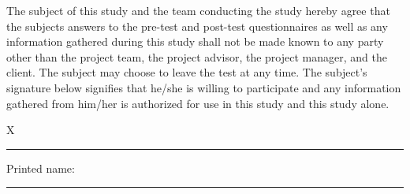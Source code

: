 \documentclass{article}
\begin{document}
\rhead{}

The subject of this study and the team conducting the study hereby agree that the subjects answers to the pre-test and post-test questionnaires as well as any information gathered during this study shall not be made known to any party other than the project team, the project advisor, the project manager, and the client.  The subject may choose to leave the test at any time.  The subject's signature below signifies that he/she is willing to participate and any information gathered from him/her is authorized for use in this study and this study alone.

\vspace{2cm}
{\large X} \rule{4in}{1pt}

\vspace{1cm}
\large Printed name: \rule{4in}{1pt}
\end{document}
